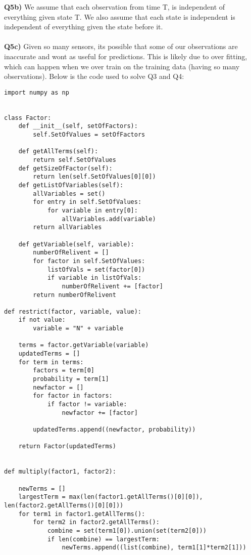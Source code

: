 \documentclass{article}
\begin{document}
\begin{titlepage}
\textbf{Q5b)} We assume that each observation from time T, is independent of everything given state T. We also assume that each state is independent is independent of everything given the state before it. \\\\
\textbf{Q5c)} Given so many sensors, its possible that some of our observations are inaccurate and wont as useful for predictions. This is likely due to over fitting, which can happen when we over train on the training data (having so many observations).
\newpage
Below is the code used to solve Q3 and Q4:
\begin{lstlisting}
import numpy as np


class Factor:
    def __init__(self, setOfFactors):
        self.SetOfValues = setOfFactors

    def getAllTerms(self):
        return self.SetOfValues
    def getSizeOfFactor(self):
        return len(self.SetOfValues[0][0])
    def getListOfVariables(self):
        allVariables = set()
        for entry in self.SetOfValues:
            for variable in entry[0]:
                allVariables.add(variable)
        return allVariables

    def getVariable(self, variable):
        numberOfRelivent = []
        for factor in self.SetOfValues:
            listOfVals = set(factor[0])
            if variable in listOfVals:
                numberOfRelivent += [factor]
        return numberOfRelivent

def restrict(factor, variable, value):
    if not value:
        variable = "N" + variable

    terms = factor.getVariable(variable)
    updatedTerms = []
    for term in terms:
        factors = term[0]
        probability = term[1]
        newfactor = []
        for factor in factors:
            if factor != variable:
                newfactor += [factor]

        updatedTerms.append((newfactor, probability))

    return Factor(updatedTerms)


def multiply(factor1, factor2):

    newTerms = []
    largestTerm = max(len(factor1.getAllTerms()[0][0]), len(factor2.getAllTerms()[0][0]))
    for term1 in factor1.getAllTerms():
        for term2 in factor2.getAllTerms():
            combine = set(term1[0]).union(set(term2[0]))
            if len(combine) == largestTerm:
                newTerms.append((list(combine), term1[1]*term2[1]))


\end{lstlisting}
\end{titlepage}
\end{document}
